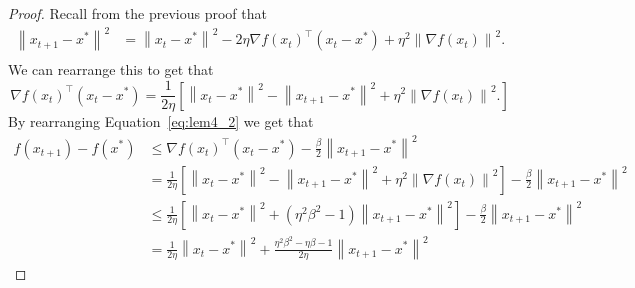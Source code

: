 \documentclass{article}
\newcommand{\norm}[1]{\left\| #1 \right\| }
\theoremstyle{definition}
\begin{document}
\begin{proof}
    Recall from the previous proof that
    \begin{equation}
        \begin{aligned}
            \norm{x_{t + 1} - x^*}^2 &= \norm{x_t - x^*}^2 - 2\eta {\nabla
            f(x_t)}^\intercal (x_t - x^*) + \eta^2 \norm{\nabla f(x_t)}^2. \\
        \end{aligned}
    \end{equation}
    We can rearrange this to get that 
    \begin{equation}
        {\nabla f(x_t)}^\intercal (x_t - x^*) = \frac{1}{2 \eta} \left[ \norm{x_t -
        x^*}^2 - \norm{x_{t + 1} -
        x^*}^2 + \eta^2 \norm{\nabla f(x_t)}^2.
        \right]
    \end{equation}
    By rearranging Equation~\ref{eq:lem4_2} we get that 
    \begin{equation}
        \begin{aligned}
            f(x_{t + 1}) - f(x^*) &\leq {\nabla f(x_t)}^\intercal (x_t - x^*) -
\frac{\beta}{2} \norm{x_{t + 1} - x^*}^2
            \\ &= \frac{1}{2 \eta} \left[ \norm{x_t -
        x^*}^2 - \norm{x_{t + 1} -
        x^*}^2 + \eta^2 \norm{\nabla f(x_t)}^2 \right] -
        \frac{\beta}{2} \norm{x_{t + 1} - x^*}^2
            \\ &\leq \frac{1}{2 \eta} \left[ \norm{x_t -
            x^*}^2 + (\eta^2\beta^2 - 1) \norm{x_{t + 1} -
        x^*}^2 \right] -
        \frac{\beta}{2} \norm{x_{t + 1} - x^*}^2
            \\ &= \frac{1}{2 \eta} \norm{x_t -
            x^*}^2+ \frac{\eta^2\beta^2  - \eta\beta - 1}{2\eta}\norm{x_{t + 1} -
        x^*}^2 
        \end{aligned}
    \end{equation}
\end{proof}



\end{document}
